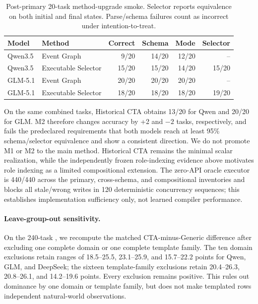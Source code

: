 \documentclass[10pt]{article}
\begin{document}
\begin{table}[h]
\centering
\small
\begin{tabular}{llrrrr}
\toprule
Model & Method & Correct & Schema & Mode & Selector \\
\midrule
Qwen3.5 & Event Graph & 9/20 & 14/20 & 12/20 & -- \\
Qwen3.5 & Executable Selector & 15/20 & 15/20 & 14/20 & 15/20 \\
GLM-5.1 & Event Graph & 20/20 & 20/20 & 20/20 & -- \\
GLM-5.1 & Executable Selector & 18/20 & 18/20 & 18/20 & 19/20 \\
\bottomrule
\end{tabular}
\caption{Post-primary 20-task method-upgrade smoke. Selector reports equivalence on both initial
and final states. Parse/schema failures count as incorrect under intention-to-treat.}
\end{table}

On the same combined tasks, Historical CTA obtains 13/20 for Qwen and 20/20 for GLM. M2 therefore
changes accuracy by +2 and $-2$ tasks, respectively, and fails the predeclared requirements that
both models reach at least 95\% schema/selector equivalence and show a consistent direction.
We do not promote M1 or M2 to the main method. Historical CTA remains the minimal scalar realization, while the
independently frozen role-indexing evidence above motivates role indexing as a limited compositional
extension. The zero-API oracle executor is 440/440 across the primary, cross-schema, and compositional inventories and blocks all stale/wrong writes
in 120 deterministic concurrency sequences; this establishes implementation sufficiency only,
not learned compiler performance.

\paragraph{Leave-group-out sensitivity.}
On the 240-task \NewSchemaReplication{}, we recompute the matched CTA-minus-Generic difference after
excluding one complete domain or one complete template family. The ten domain exclusions retain
ranges of 18.5--25.5, 23.1--25.9, and 15.7--22.2 points for Qwen, GLM, and DeepSeek; the sixteen
template-family exclusions retain 20.4--26.3, 20.8--26.1, and 14.2--19.6 points. Every exclusion
remains positive. This rules out dominance by one domain or template family, but does not make
templated rows independent natural-world observations.
\end{document}

